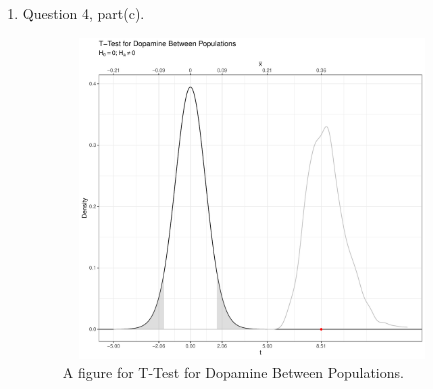 \documentclass{article}\usepackage[]{graphicx}\usepackage[]{xcolor}
\begin{document}
\begin{enumerate}
\begin{enumerate}
  \item Question 4, part(c).
\begin{figure}[H]
\centering
\includegraphics[width=10cm, height=8.5cm]{Rplot02.pdf}
\caption{A figure for T-Test for Dopamine Between Populations.}
\label{plot3}
\end{figure}

\end{enumerate}
\end{enumerate}



\end{document}
